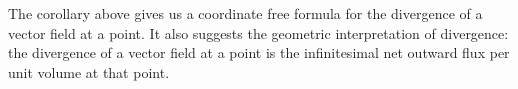 \begin{remarkenv}
    The corollary above gives us a coordinate free formula for the divergence of a vector field at a point. It also suggests the geometric interpretation of divergence: the divergence of a vector field at a point is the infinitesimal net outward flux per unit volume at that point.
\end{remarkenv}